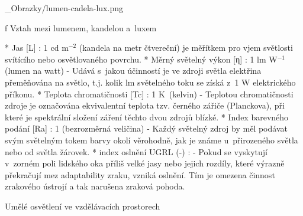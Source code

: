 \picw=10cm _Obrazky/lumen-cadela-lux.png
\caption/f Vztah mezi lumenem, kandelou a~luxem

\begitems
* {\sbf Jas [L]} : 1 cd m$^{-2}$ (kandela na metr čtvereční)
    je měřítkem pro vjem světlosti svítícího nebo osvětlovaného povrchu.
* {\sbf Měrný světelný výkon [η]} : 1 lm W$^{-1}$ (lumen na watt) -
    Udává s~jakou účinností je ve zdroji světla elektřina přeměňována na světlo, t.j. kolik
    lm světelného toku se získá z~1 W elektrického příkonu.
* {\sbf Teplota chromatičnosti [Tc]} : 1 K~(kelvin) - Teplotou chromatičnosti zdroje je označována ekvivalentní
    teplota tzv. černého zářiče (Planckova), při které je spektrální složení záření těchto dvou zdrojů blízké.
* {\sbf Index barevného podání [Ra]} : 1 (bezrozměrná veličina) -
    Každý světelný zdroj by měl podávat svým světelným tokem barvy okolí věrohodně, jak je známe u~přirozeného
    světla nebo od světla žárovek.
* {\sbf index oslnění UGRL (-)} : - Pokud se vyskytují v~zorném poli lidského oka příliš velké jasy nebo jejich
    rozdíly, které výrazně překračují mez adaptability zraku, vzniká oslnění. Tím je omezena činnost zrakového ústrojí a
    tak narušena zraková pohoda.
\enditems






\sec Umělé osvětlení ve vzdělávacích prostorech

